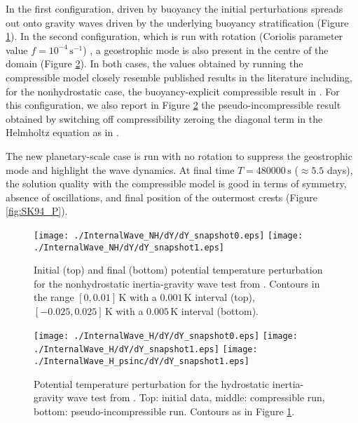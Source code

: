 \documentclass{ametsoc}
\theoremstyle{definition}
\begin{document}
In the first configuration, driven by buoyancy the initial perturbations spreads out onto gravity waves driven by the underlying buoyancy stratification (Figure \ref{fig:SK94_NH}). In the second configuration, which is run with rotation (Coriolis parameter value $f=10^{-4}\,\textrm{s}^{-1}$) , a geostrophic mode is also present in the centre of the domain (Figure \ref{fig:SK94_H}). In both cases, the values obtained by running the compressible model closely resemble published results in the literature including, for the nonhydrostatic case, the buoyancy-explicit compressible result in \cite{BenacchioEtAl2014}. For this configuration, we also report in Figure \ref{fig:SK94_H} the pseudo-incompressible result obtained by switching off compressibility zeroing the diagonal term in the Helmholtz equation as in \cite{BenacchioEtAl2014, KleinBenacchio2016}.

The new planetary-scale case is run with no rotation to suppress the geostrophic mode and highlight the wave dynamics. At final time $T=480000\,\textrm{s}$ ($\approx5.5$ days), the solution quality with the compressible model is good in terms of symmetry, absence of oscillations, and final position of the outermost crests (Figure \ref{fig:SK94_P}).  

\begin{figure}
\centering
 \texttt{[image: ./InternalWave\_NH/dY/dY\_snapshot0.eps]}
 \texttt{[image: ./InternalWave\_NH/dY/dY\_snapshot1.eps]}
 \caption{Initial (top) and final (bottom) potential temperature perturbation for the nonhydrostatic inertia-gravity wave test from \cite{SkamarockKlemp1994}. Contours in the range $[0, 0.01]\,\textrm{K}$ with a $0.001\,\textrm{K}$ interval (top), $[-0.025, 0.025]\,\textrm{K}$ with a $0.005\,\textrm{K}$ interval (bottom).}
 \label{fig:SK94_NH}
\end{figure}

\begin{figure}
\centering
 \texttt{[image: ./InternalWave\_H/dY/dY\_snapshot0.eps]}
 \texttt{[image: ./InternalWave\_H/dY/dY\_snapshot1.eps]}
 \texttt{[image: ./InternalWave\_H\_psinc/dY/dY\_snapshot1.eps]}
 \caption{Potential temperature perturbation for the hydrostatic inertia-gravity wave test from \cite{SkamarockKlemp1994}. Top: initial data, middle: compressible run, bottom: pseudo-incompressible run. Contours as in Figure \ref{fig:SK94_NH}.}
 \label{fig:SK94_H}
 \end{figure}
\end{document}
